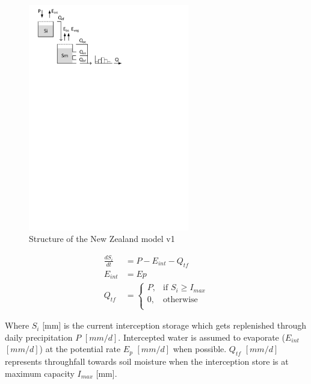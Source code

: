 { 																	%
\begin{figure}
\includegraphics[trim=1cm 22cm 7cm 1cm,width=7cm,keepaspectratio]{./AppA_files/16_schematic.pdf}
\caption{Structure of the New Zealand model v1} \label{fig:16_schematic}
\end{figure}

\begin{align}
	\frac{dS_i}{dt} &= P - E_{int} - Q_{tf}\\
	E_{int} &= Ep \\
	Q_{tf} &= \begin{cases}
		P, &\text{if } S_i \geq I_{max}\\
		0, &\text{otherwise}\\
	\end{cases}
\end{align}

Where  $S_i$ [mm] is the current interception storage which gets replenished through daily precipitation $P$ $[mm/d]$. Intercepted water is assumed to evaporate ($E_{int}$ $[mm/d]$) at the potential rate $E_p$ $[mm/d]$ when possible. $Q_{tf}$ $[mm/d]$ represents throughfall towards soil moisture when the interception store is at maximum capacity $I_{max}$ [mm].

} %


